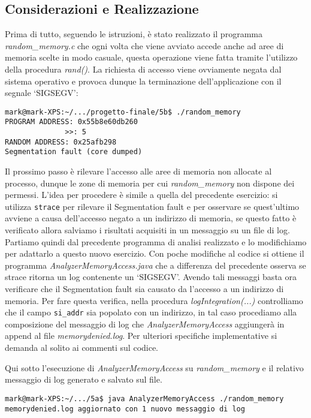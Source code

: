 \documentclass{article}
\newcommand{\pycode}[1]{\textit{#1}}
\newcommand{\filename}[1]{\textit{#1}}
\newcommand{\command}[1]{\texttt{#1}}
\begin{document}
\subsection{Considerazioni e Realizzazione}
Prima di tutto, seguendo le istruzioni, è stato realizzato il programma \filename{random\_memory.c} che ogni volta che viene avviato accede anche ad aree di memoria scelte in modo casuale, questa operazione viene fatta tramite l'utilizzo della procedura \pycode{rand()}. La richiesta di accesso viene ovviamente negata dal sistema operativo e provoca dunque la terminazione dell'applicazione con il segnale `SIGSEGV':

\begin{verbatim}
mark@mark-XPS:~/.../progetto-finale/5b$ ./random_memory
PROGRAM ADDRESS: 0x55b8e60db260
              >>: 5
RANDOM ADDRESS: 0x25afb298
Segmentation fault (core dumped)
\end{verbatim}

Il prossimo passo è rilevare l'accesso alle aree di memoria non allocate al processo, dunque le zone di memoria per cui \filename{random\_memory} non dispone dei permessi. L'idea per procedere è simile a quella del precedente esercizio: si utilizza \command{strace} per rilevare il Segmentation fault e per osservare se quest'ultimo avviene a causa dell'accesso negato a un indirizzo di memoria, se questo fatto è verificato allora salviamo i risultati acquisiti in un messaggio su un file di log.
Partiamo quindi dal precedente programma di analisi realizzato e lo modifichiamo per adattarlo a questo nuovo esercizio. Con poche modifiche al codice si ottiene il programma \filename{AnalyzerMemoryAccess.java} che a differenza del precedente osserva se strace ritorna un log contenente un `SIGSEGV'. Avendo tali messaggi basta ora verificare che il Segmentation fault sia causato da l'accesso a un indirizzo di memoria. Per fare questa verifica, nella procedura \pycode{logIntegration(...)} controlliamo che il campo \command{si\_addr} sia popolato con un indirizzo, in tal caso procediamo alla composizione del messaggio di log che \filename{AnalyzerMemoryAccess} aggiungerà in append al file \filename{memorydenied.log}. Per ulteriori specifiche implementative si demanda al solito ai commenti sul codice.

Qui sotto l'esecuzione di \filename{AnalyzerMemoryAccess} su \filename{random\_memory} e il relativo messaggio di log generato e salvato sul file.

\begin{verbatim}
mark@mark-XPS:~/.../5a$ java AnalyzerMemoryAccess ./random_memory
memorydenied.log aggiornato con 1 nuovo messaggio di log
\end{verbatim}
\end{document}
